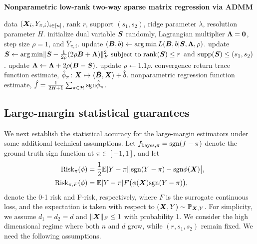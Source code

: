 \documentclass[11pt]{article}
\theoremstyle{plain}
\theoremstyle{definition}
\def\sign{\textup{sgn}}
\def\bayespif{f_{\textup{bayes},\pi}}
\def\rank{\textup{rank}}
\def\risk{\textup{Risk}_\pi}
\def\riskF{\textup{Risk}_{\pi,F}}
\begin{document}
\begin{algorithm}[t!]
\caption{{\bf Nonparametric low-rank two-way sparse matrix regression via ADMM} } \label{alg:weighted}
\begin{algorithmic}[1] 
\INPUT data $(\bm X_i,Y_{\pi, i})_{i\in[n]}$, rank $r$, support $(s_1,s_2)$, ridge parameter $\lambda$, resolution parameter $H$.
\State initialize dual variable $\bm S$ randomly, Lagrangian multiplier $\bm{\Lambda}=\mathbf{0}$, step size $\rho=1$, and $\bar Y_{\pi, i}$.
\Repeat
\State update $(\bm B,b) \leftarrow \operatorname*{arg\,min} L(\bm B, b|\bm S,\bm{\Lambda},\rho)$.
\State update $\mS \leftarrow  \argmin \FnormSize{}{\mS-{1\over 2\rho}(2\rho\mB+\mLambda)}^2 \ \text{subject to }\rank(\mS)\leq r$ and $\text{supp}(\bm S)\leq (s_1,s_2)$.
\State update $\bm{\Lambda} \leftarrow \bm{\Lambda}+2\rho(\bm B-\bm S)$.
\State update $\rho\leftarrow1.1\rho$.
\Until convergence
\State return trace function estimate, $\hat \phi_\pi\colon \bm X\mapsto \langle \hat {\bm B}, \bm X \rangle+\hat b$.
\EndFor
\OUTPUT nonparametric regression function estimate, $\hat f= {1\over 2H+1}\sum_{\pi \in \tH}\sign \hat \phi_\pi$.
\end{algorithmic}
\end{algorithm}



\subsection{Large-margin statistical guarantees}\label{sec:large-margin}

We next establish the statistical accuracy for the large-margin estimators under some additional technical assumptions. Let $\bayespif=\sign(f-\pi)$ denote the ground truth sign function at $\pi\in[-1,1]$, and let
\begin{align} \label{eq:riskdef}
\begin{split}
\risk(\phi) & =  {1\over 2}\mathbb{E}|Y-\pi| \big|\sign(Y-\pi)-\sign \phi(\mX)\big|, \\
\riskF(\phi) & =  \mathbb{E}|Y-\pi|F\big(\phi(\mX)\sign(Y-\pi)\big), 
\end{split}
\end{align}
denote the 0-1 risk and F-risk, respectively, where $F$ is the surrogate continuous loss, and the expectation is taken with respect to $(\bm X,Y)\sim \mathbb{P}_{\bm X,Y}$. For simplicity, we assume $d_1 = d_2 = d$ and $\lVert\bm X\rVert_F\leq 1$ with probability 1. We consider the high dimensional regime where both $n$ and $d$ grow, while $(r,s_1,s_2)$ remain fixed. We need the following assumptions. 
 
\end{document}
